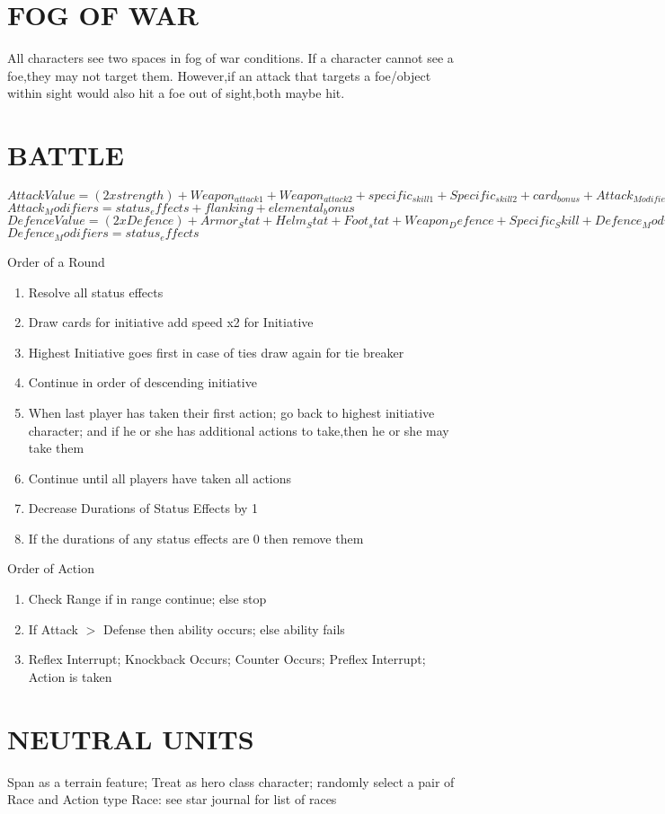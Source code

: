 \section{FOG OF WAR}
All characters see two spaces in fog of war conditions.  If a character cannot see a foe,they may not target them.  However,if an attack that targets a foe/object within sight would also hit a foe out of sight,both maybe hit.  
\section{BATTLE }
$Attack Value = (2 x strength)  + Weapon_{attack1} +Weapon_{attack2}+ specific_{skill1} + Specific_{skill2}  + card_{bonus}+ Attack_{Modifiers}$
$Attack_Modifiers = status_effects+ flanking + elemental_bonus$
$Defence Value = (2 x Defence)+ Armor_Stat+ Helm_Stat + Foot_stat+ Weapon_Defence+ Specific_Skill
+ Defence_Modifiers+5$
$Defence_Modifiers  =   status_effects$

Order of a Round
\begin{enumerate}
\item Resolve all status effects 
\item Draw cards for initiative add speed x2 for Initiative
\item Highest Initiative goes first in case of ties draw again for tie breaker
\item Continue in order of descending initiative
\item When last player has taken their first action; go back to highest initiative character; and if he or she has additional actions to take,then he or she may take them
\item Continue until all players have taken all actions
\item Decrease Durations of Status Effects by 1
\item If the durations of any status effects are 0 then remove them
\end{enumerate} 

 Order of Action
\begin{enumerate}
\item Check Range if in range continue; else stop
\item If Attack $>$ Defense then ability occurs; else ability fails
\item Reflex Interrupt; Knockback Occurs; Counter Occurs; Preflex Interrupt; Action is taken
\end{enumerate}

\section{NEUTRAL UNITS}
Span as a terrain feature; Treat as hero class character; randomly select a pair of Race and Action type
Race: see star journal for list of races
